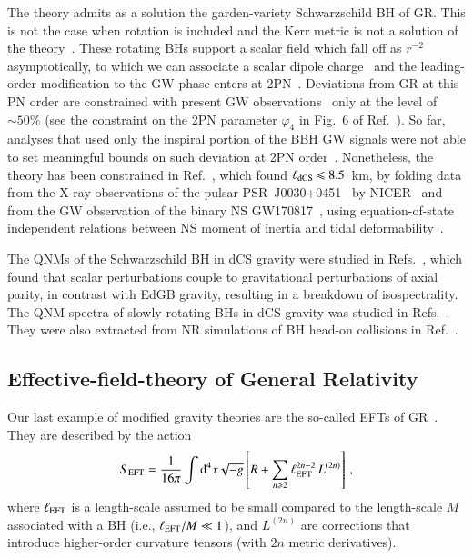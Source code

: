 \documentclass[twocolumn,
               prd,
               aps,
               superscriptaddress,
               tightenlines,
               nofootinbib,
               eqsecnum,
               amsfonts,
               amsmath,
               longbibliography]{revtex4-1}
\newcommand{\dd}{{\rm d}}
\begin{document}
The theory admits as a solution the garden-variety Schwarzschild BH of GR.
This is not the case when rotation is included and the Kerr metric is not a
solution of the theory~\cite{Jackiw:2003pm}.
%
These rotating BHs support a scalar field which fall off as
$r^{-2}$ asymptotically, to which we can associate a scalar dipole
charge~\cite{Yunes:2009hc,Konno:2009kg} and
%
the leading-order modification to the GW phase enters at 2PN~\cite{Yagi:2011xp}.
%
Deviations from GR at this PN order are constrained with present GW observations~\cite{LIGOScientific:2021sio}
only at the level of $\sim 50\%$ (see the constraint on the 2PN parameter $\varphi_4$ in Fig.~6 of
Ref.~\cite{LIGOScientific:2021sio}). So far, analyses that used only the inspiral portion of
the BBH GW signals were not able to set meaningful bounds on such deviation at 2PN order~\cite{Nair:2019iur,Perkins:2021mhb}.
%
Nonetheless, the theory has been constrained in Ref.~\cite{Silva:2020acr}, which found
%
$\ell_{\rm dCS} \leqslant 8.5$~km,
%
by folding data from the X-ray observations of the pulsar
PSR~J0030+0451~\cite{Lommen:2000yt,NANOGrav:2017wvv} by
NICER~\cite{Riley:2019yda,Miller:2019cac} and from the GW observation of the binary
NS GW170817~\cite{TheLIGOScientific:2017qsa,LIGOScientific:2018cki}, using
equation-of-state independent relations between NS moment of inertia and tidal deformability~\cite{Yagi:2013bca,Yagi:2013awa,Gupta:2017vsl}.

The QNMs of the Schwarzschild BH in dCS gravity were studied in
Refs.~\cite{Yunes:2007ss,Cardoso:2009pk,Molina:2010fb}, which found that scalar
perturbations couple to gravitational perturbations of axial parity, in contrast
with EdGB gravity, resulting in a breakdown of isospectrality.
%
The QNM spectra of slowly-rotating BHs in dCS gravity was
studied in Refs.~\cite{Srivastava:2021imr,Wagle:2021tam}.
%
They were also extracted from NR simulations of BH head-on collisions in Ref.~\cite{Okounkova:2019dfo}.

\subsection{Effective-field-theory of General Relativity}

Our last example of modified gravity theories are the so-called
EFTs of GR~\cite{Endlich:2017tqa,Sennett:2019bpc,deRham:2020ejn,Cano:2020cao,Cano:2021myl}.
%
They are described by the action
%
\begin{equation} \label{eq:action_eft}
    S_{\rm EFT} = \frac{1}{16 \pi}
    \int \dd^4x \sqrt{-g}
    \left[ R
    +
    \sum_{n \geqslant 2} \ell_{\rm EFT}^{2n - 2}\, L^{(2n)}
    \right]\,,
\end{equation}
%
where $\ell_{\rm EFT}$ is a length-scale assumed to be small compared to the length-scale $M$
associated with a BH (i.e., $\ell_{\rm EFT} / M \ll 1$), and $L^{(2n)}$ are corrections
that introduce higher-order curvature tensors (with $2n$ metric derivatives).
\end{document}
